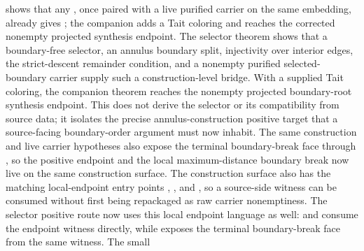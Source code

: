 \documentclass[11pt]{article}
\begin{document}
shows that any , once paired with a
live purified carrier on the same embedding, already gives
; the companion
adds a Tait coloring and reaches the corrected nonempty projected synthesis
endpoint.  The selector theorem
shows that a boundary-free selector, an annulus boundary split, injectivity over
interior edges, the strict-descent remainder condition, and a nonempty purified
selected-boundary carrier supply such a construction-level bridge.  With a
supplied Tait coloring, the companion theorem
reaches the nonempty projected boundary-root synthesis endpoint.  This does not
derive the selector or its compatibility from source data; it isolates the
precise annulus-construction positive target that a source-facing
boundary-order argument must now inhabit.  The same construction and live
carrier hypotheses also expose the terminal boundary-break face through
,
so the positive endpoint and the local maximum-distance boundary break now live
on the same construction surface.  The construction surface also has the
matching local-endpoint entry points
,
,
and
,
so a source-side  witness can be consumed
without first being repackaged as raw carrier nonemptiness.  The selector
positive route now uses this local endpoint language as well:
and
consume the endpoint witness directly, while
exposes the terminal boundary-break face from the same witness.  The small
\end{document}
